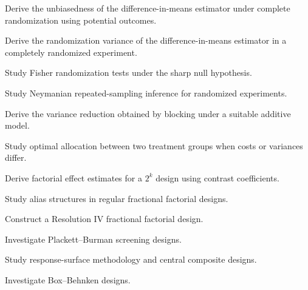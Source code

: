 \begin{exercise}[4]
Derive the unbiasedness of the difference-in-means estimator under
complete randomization using potential outcomes.
\end{exercise}

\begin{exercise}[4]
Derive the randomization variance of the difference-in-means estimator in
a completely randomized experiment.
\end{exercise}

\begin{exercise}[4]
Study Fisher randomization tests under the sharp null hypothesis.
\end{exercise}

\begin{exercise}[4]
Study Neymanian repeated-sampling inference for randomized experiments.
\end{exercise}

\begin{exercise}[4]
Derive the variance reduction obtained by blocking under a suitable
additive model.
\end{exercise}

\begin{exercise}[4]
Study optimal allocation between two treatment groups when costs or
variances differ.
\end{exercise}

\begin{exercise}[4]
Derive factorial effect estimates for a \(2^k\) design using contrast
coefficients.
\end{exercise}

\begin{exercise}[4]
Study alias structures in regular fractional factorial designs.
\end{exercise}

\begin{exercise}[4]
Construct a Resolution IV fractional factorial design.
\end{exercise}

\begin{exercise}[4]
Investigate Plackett--Burman screening designs.
\end{exercise}

\begin{exercise}[4]
Study response-surface methodology and central composite designs.
\end{exercise}

\begin{exercise}[4]
Investigate Box--Behnken designs.
\end{exercise}

